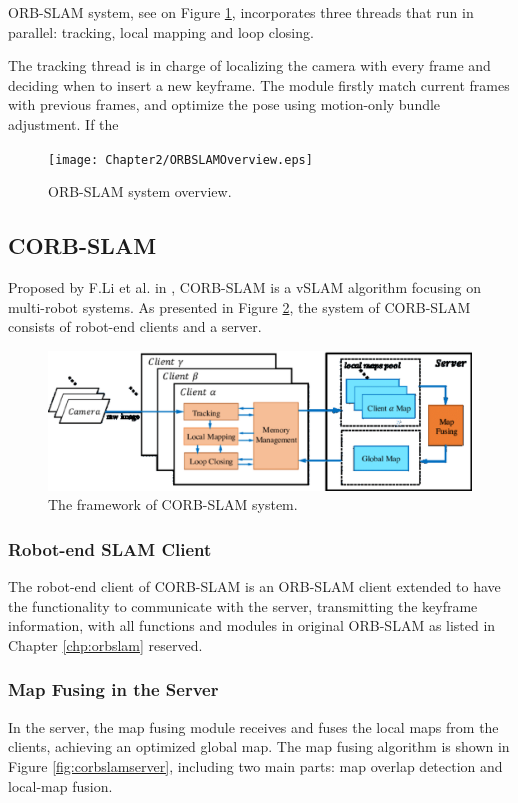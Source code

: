 ORB-SLAM system, see on Figure \ref{fig:orbslamoverview}, incorporates three threads that run in parallel: tracking, local mapping and loop closing. 

The tracking thread is in charge of localizing the camera with every frame and deciding when to insert a new keyframe.	The module firstly match current frames with previous frames, and optimize the pose using motion-only bundle adjustment. If the 

\begin{figure}[H]
	\centering
	\texttt{[image: Chapter2/ORBSLAMOverview.eps]}
	\caption{ORB-SLAM system overview.}
	\label{fig:orbslamoverview} 
\end{figure}

\subsection{CORB-SLAM}
Proposed by F.Li et al. in \cite{li2017corb}, CORB-SLAM is a vSLAM algorithm focusing on  multi-robot systems. As presented in Figure \ref{fig:corbslamoverview}, the system of CORB-SLAM consists of robot-end clients and a server.
\begin{figure}[H]
	\centering
	\includegraphics[width=5in]{Chapter2/CORBSLAMOverview.eps}
	\caption{The framework of CORB-SLAM system.}
	\label{fig:corbslamoverview} 
\end{figure}

\subsubsection{Robot-end SLAM Client}
The robot-end client of CORB-SLAM is an ORB-SLAM client extended to have the functionality to communicate with the server, transmitting the keyframe information, with all functions and modules in original ORB-SLAM as listed in Chapter \ref{chp:orbslam} reserved.

\subsubsection{Map Fusing in the Server}
In the server, the map fusing module receives and fuses the local maps from the clients, achieving an optimized global map. The map fusing algorithm is shown in Figure \ref{fig:corbslamserver}, including two main parts: map overlap detection and local-map fusion.

